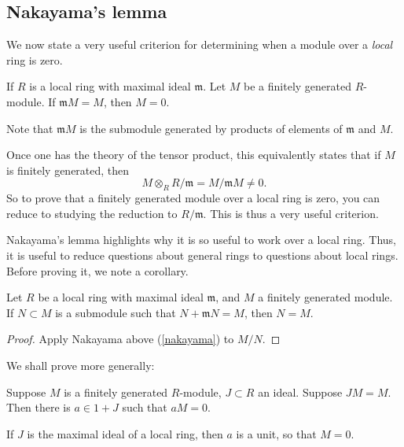 \subsection{Nakayama's lemma}

We now state a very useful criterion for determining when a module over a
\emph{local} ring is zero.


\begin{lemma} \label{nakayama} If $R$ is a local ring with
maximal ideal
$\mathfrak{m}$. Let $M$ be a finitely generated $R$-module.  If
$\mathfrak{m}M = M$, then $M = 0$.
\end{lemma}

Note that $\mathfrak{m}M$ is the submodule generated by products of
elements of $\mathfrak{m}$ and $M$.

\begin{remark}
Once one has the theory of the tensor product, this equivalently states that
if $M$ is finitely generated, then
\[ M \otimes_R R/\mathfrak{m} = M/\mathfrak{m}M \neq 0.  \]
So to prove that a finitely generated module over a local ring is zero, you
can reduce to studying the reduction to $R/\mathfrak{m}$. This is thus a very
useful criterion.
\end{remark}

Nakayama's lemma highlights why it is so useful to work over a local ring.
Thus, it is useful to reduce questions about general rings to questions about
local rings.
Before proving it, we note a corollary.

\begin{corollary}
Let $R$ be a local ring with maximal ideal $\mathfrak{m}$, and $M$ a finitely
generated module. If $N \subset M$ is a submodule such that $N +
\mathfrak{m}N =
M$, then $N=M$.
\end{corollary}
\begin{proof}
Apply Nakayama above (\cref{nakayama}) to $M/N$.
\end{proof}


We shall prove more generally:

\begin{proposition} 
Suppose $M$ is a finitely generated $R$-module, $J \subset R$ an ideal.
Suppose $JM = M$. Then there is $a \in 1+J$ such that $aM = 0$.
\end{proposition} 

If $J$ is the maximal ideal of a local ring, then $a$ is a unit, so that $M=0$.

